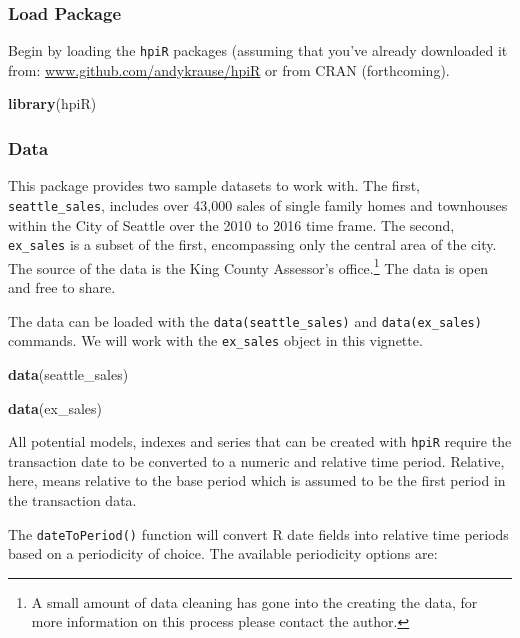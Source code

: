 \documentclass[]{article}
\newenvironment{Shaded}{\begin{snugshade}}{\end{snugshade}}
\newcommand{\KeywordTok}[1]{\textcolor[rgb]{0.13,0.29,0.53}{\textbf{#1}}}
\newcommand{\NormalTok}[1]{#1}
\let\rmarkdownfootnote\footnote%
\def\footnote{\protect\rmarkdownfootnote}
\begin{document}
\subsubsection{Load Package}\label{load-package}

Begin by loading the \texttt{hpiR} packages (assuming that you've
already downloaded it from:
\href{https://www.github.com/andykrause/hpiR}{www.github.com/andykrause/hpiR}
or from CRAN (forthcoming).

\begin{Shaded}
\begin{Highlighting}[]
  \KeywordTok{library}\NormalTok{(hpiR)}
\end{Highlighting}
\end{Shaded}

\subsubsection{Data}\label{data}

This package provides two sample datasets to work with. The first,
\texttt{seattle\_sales}, includes over 43,000 sales of single family
homes and townhouses within the City of Seattle over the 2010 to 2016
time frame. The second, \texttt{ex\_sales} is a subset of the first,
encompassing only the central area of the city. The source of the data
is the King County Assessor's office.\footnote{A small amount of data
  cleaning has gone into the creating the data, for more information on
  this process please contact the author.} The data is open and free to
share.

The data can be loaded with the \texttt{data(seattle\_sales)} and
\texttt{data(ex\_sales)} commands. We will work with the
\texttt{ex\_sales} object in this vignette.

\begin{Shaded}
\begin{Highlighting}[]
  \KeywordTok{data}\NormalTok{(seattle_sales)}

  \KeywordTok{data}\NormalTok{(ex_sales)}
\end{Highlighting}
\end{Shaded}

All potential models, indexes and series that can be created with
\texttt{hpiR} require the transaction date to be converted to a numeric
and relative time period. Relative, here, means relative to the base
period which is assumed to be the first period in the transaction data.

The \texttt{dateToPeriod()} function will convert R date fields into
relative time periods based on a periodicity of choice. The available
periodicity options are:
\end{document}
